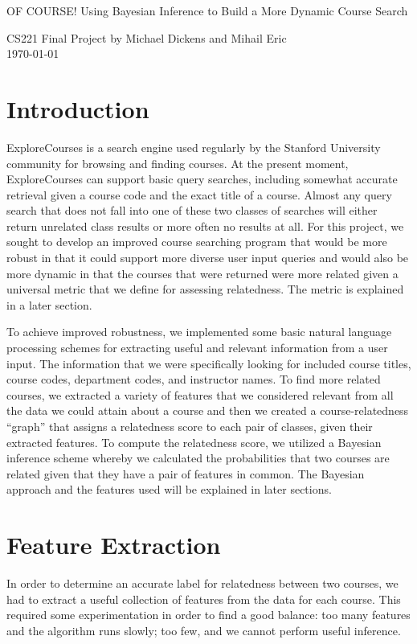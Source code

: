 \documentclass[12pt]{article}
\begin{document}
\begin{center}
{\Large OF COURSE! Using Bayesian Inference to Build a More Dynamic
  Course Search}

{\normalsize CS221 Final Project by Michael Dickens and Mihail Eric}\\
\today 
\end{center}


\section*{Introduction}
ExploreCourses is a search engine used regularly by the Stanford
University community for browsing and finding courses. At the present
moment, ExploreCourses can support basic query searches, including
somewhat accurate retrieval given a course code and the exact title of
a course. Almost any query search that does not fall into one of these
two classes of searches will either return unrelated class results or
more often no results at all. For this project, we sought to develop
an improved course searching program that would be more robust in that
it could support more diverse user input queries and would also be
more dynamic in that the courses that were returned were more related
given a universal metric that we define for assessing relatedness. The
metric is explained in a later section.

To achieve improved robustness, we implemented some basic natural
language processing schemes for extracting useful and relevant
information from a user input. The information that we were
specifically looking for included course titles, course codes,
department codes, and instructor names. To find more related courses,
we extracted a variety of features that we considered relevant from
all the data we could attain about a course and then we created a
course-relatedness ``graph'' that assigns a relatedness score to each
pair of classes, given their extracted features. To compute the
relatedness score, we utilized a Bayesian inference scheme whereby we
calculated the probabilities that two courses are related given that
they have a pair of features in common. The Bayesian approach and the
features used will be explained in later sections.

\section*{Feature Extraction}
In order to determine an accurate label for relatedness
between two courses, we had to extract a useful collection of
features from the data for each course. This required some
experimentation in order to find a good balance: too many features and
the algorithm runs slowly; too few, and we cannot perform useful
inference.
\end{document}
